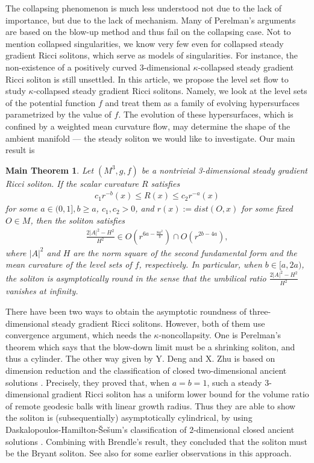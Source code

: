 \documentclass[12pt,a4paper]{amsart}
\newtheorem*{MThm}{Main Theorem}
\begin{document}
The collapsing phenomenon is much less understood not due to the lack of importance, but due to the lack of mechanism.
Many of Perelman's arguments are based on the blow-up method and thus fail on the collapsing case.
Not to mention collapsed singularities, we know very few even for collapsed steady gradient Ricci solitons,
which serve as models of singularities. For instance, the non-existence of a positively curved 3-dimensional
$\kappa$-collapsed steady gradient Ricci soliton is still unsettled.
In this article, we propose the level set flow to study $\kappa$-collapsed steady gradient Ricci solitons.
Namely, we look at the level sets of the potential function $f$ and treat them as a family of evolving hypersurfaces parametrized by the value of $f$.
The evolution of these hypersurfaces, which is confined by a weighted mean curvature flow,
may determine the shape of the ambient manifold --- the steady soliton we would like to investigate.
Our main result is
\begin{MThm}
Let $(M^3, g, f)$ be a nontrivial 3-dimensional steady gradient Ricci soliton.
If the scalar curvature $R$ satisfies
\begin{align}\label{ab}
c_1 r^{-b}(x)\leq R(x)\leq c_2 r^{-a}(x)
\end{align}
for some $a\in(0,1], b\geq a$, $c_1,c_2>0$, and $r(x):=dist(O,x)$ for some fixed $O\in M$,
then the soliton satisfies
\begin{align*}
\frac{2|A|^2-H^2}{H^2}\in O\left(r^{6a-\frac{8a^2}{b}}\right)\cap O\left(r^{2b-4a}\right),
\end{align*}
where $|A|^2$ and $H$ are the norm square of the second fundamental form and the mean curvature of the level sets of $f$, respectively. In particular, when $b\in[a,2a)$, the soliton is asymptotically round in the sense that the umbilical ratio $\frac{2|A|^2-H^2}{H^2}$ vanishes at infinity. 
\end{MThm}

There have been two ways to obtain the asymptotic roundness of three-dimensional steady gradient Ricci solitons.
However, both of them use convergence argument, which needs the $\kappa$-noncollapsity.
One is Perelman's theorem which says that the blow-down limit must be a shrinking soliton,
and thus a cylinder. The other way given by Y. Deng and X. Zhu is based on dimension reduction and the classification of
closed two-dimensional ancient solutions \cite{DengZhu16}.
Precisely, they proved that, when $a=b=1$,
such a steady 3-dimensional gradient Ricci soliton has a uniform lower bound for the volume ratio of remote geodesic balls with linear growth radius.
Thus they are able to show the soliton is (subsequentially) asymptotically
cylindrical, by using Daskalopoulos-Hamilton-\v{S}e\v{s}um's classification of $2$-dimensional closed ancient solutions
\cite{DaskalopoulosHamiltonSesum12}. Combining with Brendle's result,
they concluded that the soliton must be the Bryant soliton. See also \cite{Guo09MA} for some earlier observations in this approach.
\end{document}

